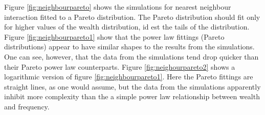 \documentclass[10pt, a4paper]{amsart}
\begin{document}
Figure \ref{fig:neighbourpareto} shows the simulations for nearest neighbour interaction fitted to a Pareto distribution. The Pareto distribution should fit only for higher values of the wealth distribution, id est the tails of the distribution. Figure \ref{fig:neighbourpareto1} show that the power law fittings (Pareto distributions) appear to have similar shapes to the results from the simulations. One can see, however, that the data from the simulations tend drop quicker than their Pareto power law counterparts. Figure \ref{fig:neighourpareto2} shows a logarithmic version of figure \ref{fig:neighbourpareto1}. Here the Pareto fittings are straight lines, as one would assume, but the data from the simulations apparently inhibit more complexity than the a simple power law relationship between wealth and frequency.
\end{document}
